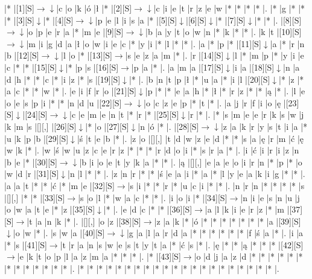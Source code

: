 \documentclass[11pt]{article}
\newcommand\drarr{$\rightarrow \!\!\!\!\! \downarrow$}
\newcommand\rarr{$\rightarrow$}
\newcommand\darr{$\downarrow$}
\begin{document}
\noindent\begin{Puzzle}{20}{27}|*	|[1][S]\drarr	|c	|o	|k	|ó	|ł	|*	|[2][S]\drarr	|c	|i	|e	|t	|r	|z	|e	|w	|*	|*	|*	|*	|.
|*	|g	|*	|*	|*	|[3][S]\darr	|*	|[4][S]\drarr	|p	|e	|l	|i	|s	|a	|*	|[5][S]\darr	|[6][S]\darr	|*	|[7][S]\darr	|*	|*	|.
|[8][S]\drarr	|o	|p	|e	|r	|a	|*	|m	|e	|[9][S]\drarr	|b	|a	|y	|t	|o	|w	|n	|*	|k	|*	|*	|.
|k	|t	|[10][S]\drarr	|m	|i	|g	|d	|a	|ł	|o	|w	|i	|e	|c	|*	|y	|i	|*	|l	|*	|*	|.
|a	|*	|p	|*	|[11][S]\darr	|a	|*	|r	|n	|b	|[12][S]\drarr	|l	|o	|*	|[13][S]\rarr	|s	|e	|z	|a	|m	|*	|.
|r	|[14][S]\darr	|l	|*	|m	|p	|*	|y	|i	|e	|c	|*	|*	|[15][S]\darr	|*	|p	|s	|[16][S]\rarr	|p	|a	|*	|.
|a	|m	|a	|[17][S]\darr	|i	|a	|[18][S]\darr	|n	|a	|d	|h	|*	|*	|c	|*	|i	|z	|*	|s	|[19][S]\darr	|*	|.
|b	|n	|t	|p	|ł	|*	|u	|a	|*	|i	|l	|[20][S]\darr	|*	|z	|*	|a	|c	|*	|*	|w	|*	|.
|e	|i	|f	|r	|o	|[21][S]\darr	|p	|*	|*	|e	|a	|h	|*	|ł	|*	|r	|z	|*	|*	|ą	|*	|.
|l	|e	|o	|e	|s	|p	|i	|*	|*	|n	|d	|u	|[22][S]\drarr	|o	|c	|z	|e	|p	|*	|t	|*	|.
|a	|j	|r	|f	|i	|o	|ę	|[23][S]\darr	|[24][S]\drarr	|c	|e	|m	|e	|n	|t	|*	|r	|*	|[25][S]\darr	|r	|*	|.
|*	|s	|m	|e	|e	|r	|k	|s	|w	|j	|k	|m	|s	|[][,]{ }	|[26][S]\darr	|*	|o	|[27][S]\darr	|n	|ó	|*	|.
|[28][S]\drarr	|z	|a	|k	|r	|y	|s	|t	|i	|a	|*	|u	|k	|p	|b	|[29][S]\darr	|ś	|t	|e	|b	|*	|.
|z	|o	|[][,]{ }	|t	|d	|w	|z	|e	|d	|*	|*	|s	|a	|ę	|r	|m	|ć	|ę	|w	|k	|*	|.
|w	|ś	|w	|u	|z	|c	|e	|r	|z	|*	|*	|*	|r	|d	|o	|i	|*	|s	|r	|a	|*	|.
|i	|ć	|i	|r	|i	|z	|n	|b	|e	|*	|[30][S]\drarr	|b	|i	|o	|e	|t	|y	|k	|a	|*	|*	|.
|ą	|[][,]{ }	|e	|a	|e	|o	|i	|r	|n	|*	|p	|*	|o	|w	|d	|r	|[31][S]\darr	|n	|l	|*	|*	|.
|z	|n	|r	|*	|*	|ś	|e	|a	|i	|*	|a	|*	|l	|y	|e	|a	|k	|i	|g	|*	|*	|.
|a	|a	|t	|*	|*	|ć	|*	|m	|e	|[32][S]\rarr	|s	|i	|*	|*	|r	|*	|u	|c	|i	|*	|*	|.
|n	|r	|n	|*	|*	|*	|*	|s	|[][,]{ }	|*	|*	|[33][S]\rarr	|s	|o	|l	|*	|w	|a	|c	|*	|*	|.
|i	|o	|i	|*	|[34][S]\rarr	|n	|i	|e	|s	|n	|u	|j	|o	|w	|a	|t	|e	|*	|z	|[35][S]\darr	|*	|.
|e	|d	|c	|*	|*	|[36][S]\rarr	|a	|l	|k	|i	|e	|r	|z	|*	|m	|[37][S]\rarr	|t	|a	|n	|k	|*	|.
|[][,]{ }	|o	|z	|[38][S]\rarr	|z	|a	|k	|*	|ó	|*	|*	|*	|*	|*	|*	|*	|a	|[39][S]\darr	|o	|w	|*	|.
|s	|w	|a	|[40][S]\drarr	|g	|a	|l	|a	|r	|d	|a	|*	|*	|*	|*	|*	|*	|f	|ś	|a	|*	|.
|i	|a	|*	|s	|[41][S]\rarr	|t	|r	|a	|n	|s	|w	|e	|s	|t	|y	|t	|a	|*	|ć	|s	|*	|.
|ę	|*	|*	|ą	|*	|*	|*	|[42][S]\rarr	|e	|k	|t	|o	|p	|l	|a	|z	|m	|a	|*	|*	|*	|.
|*	|[43][S]\rarr	|o	|d	|j	|a	|z	|d	|*	|*	|*	|*	|*	|*	|*	|*	|*	|*	|*	|*	|*	|.
|*	|*	|*	|*	|*	|*	|*	|*	|*	|*	|*	|*	|*	|*	|*	|*	|*	|*	|*	|*	|*	|.\end{Puzzle}

\newpage
\end{document}
